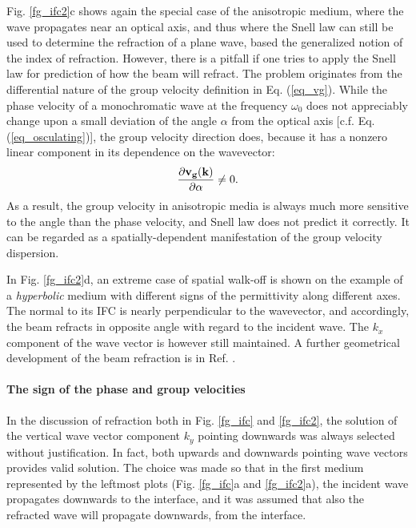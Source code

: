 Fig. \ref{fg_ifc2}c shows again the special case of the anisotropic medium, where the wave propagates near an optical axis, and thus where the Snell law can still be used to determine the refraction of a plane wave, based the generalized notion of the index of refraction.
However, there is a pitfall if one tries to apply the Snell law for prediction of how the beam will refract. The problem originates from the differential nature of the group velocity definition in Eq. (\ref{eq_vg}). 
While the phase velocity of a monochromatic wave at the frequency $\omega_0$ does not appreciably change upon a small deviation of the angle $\alpha$ from the optical axis  [c.f.  Eq. (\ref{eq_osculating})], the group velocity direction does, because it has a nonzero linear component in its dependence on the wavevector:
$$ \frac{\partial {\mathbf{v_g}}({\mathbf{k}})}{\partial \alpha} \neq 0.$$
As a result, the group velocity in anisotropic media is always much more sensitive to the angle than the phase velocity, and Snell law does not predict it correctly. It can be regarded as a spatially-dependent manifestation of the group velocity dispersion.

In Fig. \ref{fg_ifc2}d, an extreme case of spatial walk-off is shown on the example of a \textit{hyperbolic} medium with different signs of the permittivity along different axes. %
 The normal to its IFC is nearly perpendicular to the wavevector, and accordingly, the beam refracts in opposite angle with regard to the incident wave. The $k_x$ component of the wave vector is however still maintained. A further geometrical development of the beam refraction is in Ref. \cite[p. 46]{klingshirn2007semiconductor}.


\paragraph{The sign of the phase and group velocities}  %
In the discussion of refraction both in Fig. \ref{fg_ifc} and \ref{fg_ifc2}, the solution of the vertical wave vector component $k_y$ pointing downwards was always selected without justification. In fact, both upwards and downwards pointing wave vectors provides valid solution. The choice was made so that in the first medium represented by the leftmost plots (Fig. \ref{fg_ifc}a and \ref{fg_ifc2}a), the incident wave propagates downwards to the interface, and it was assumed that also the refracted wave will propagate downwards, from the interface.

